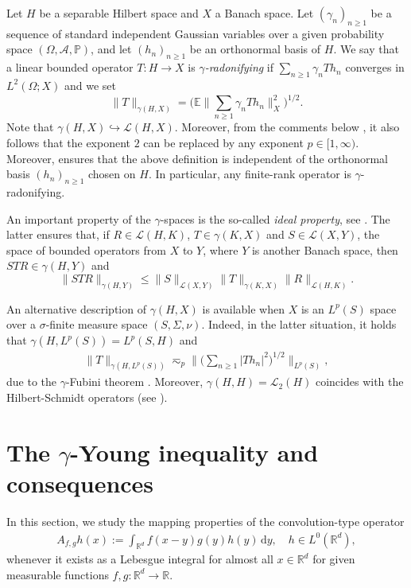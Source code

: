 \documentclass[reqno]{amsart}
\theoremstyle{plain}
\theoremstyle{remark}
\theoremstyle{plain}
\numberwithin{equation}{section}
\newcommand\bR{\mathbb{R}}
\renewcommand\P{\mathbb{P}}
\newcommand\calL{\mathcal{L}}
\def\R{{\mathbb R}}
\newcommand{\E}{{\mathbb E}}
\renewcommand{\P}{{\mathbb P}}
\newcommand{\g}{\gamma}
\renewcommand{\O}{\Omega}
\newcommand{\di}{\mathrm{d}}
\newcommand{\1}{\one}
\newcommand{\embed}{\hookrightarrow}
\begin{document}
\smallskip

Let $H$ be a separable Hilbert space and $X$ a Banach space.
Let $(\g_n)_{n\geq 1}$ be a sequence of standard independent Gaussian variables over a given probability space $(\O,\mathcal{A},\P)$, and let $(h_n)_{n\geq 1}$ be an orthonormal basis of $H$. 
We say that a linear bounded operator $T:H\to X$ is \emph{$\g$-radonifying} if $\sum_{n\geq 1} \g_n T h_n$ converges in $L^2(\O;X)$ and we set
\begin{equation}
\label{eq:def_gamma_norm}
\|T\|_{\g(H,X)}=
\Big(\E \Big\| \sum_{n\geq 1} \g_n T h_n\Big\|_{X}^2\Big)^{1/2}.
\end{equation}
Note that $\g(H,X)\embed \calL(H,X)$. Moreover, from the comments below \cite[Definition 9.1.1]{HNVW2}, it also follows that the exponent $2$ can be replaced by any exponent $p\in [1,\infty)$.
Moreover, \cite[Theorem 9.1.17]{HNVW2} ensures that the above definition is independent of the orthonormal basis $(h_n)_{n\geq 1}$ chosen on $H$. 
In particular, any finite-rank operator is $\gamma$-radonifying. 


An important property of the $\gamma$-spaces is the so-called \emph{ideal property}, see \cite[Theorem 9.1.10]{HNVW2}. The latter ensures that, if $R\in \calL(H,K)$, $T\in \g(K,X)$ and $S\in \calL(X,Y)$, the space of bounded operators from $X$ to $Y$, where $Y$ is another Banach space, then 
$STR\in \g(H,Y)$ and 
\begin{equation}
\label{eq:gamma_ideal}
\|STR\|_{\g(H,Y)}\leq\|S\|_{\calL(X,Y)} \|T\|_{\g(K,X)} \|R\|_{\calL(H,K)}.
\end{equation}

An alternative description of $\g(H,X)$ is available when $X$ is an $L^p(S)$ space over a $\sigma$-finite measure space $(S,\Sigma,\nu)$. Indeed, in the latter situation, it holds that $\g(H,L^p(S))=L^p(S,H)$ and 
\begin{align}
\label{eq: square fct char gamma}
    \|T\|_{\gamma(H,L^p(S))} \eqsim_p \Big\| \Big(  \sum_{n\geq 1} |Th_n|^2 \Big)^{1/2} \Big\|_{L^p(S)},
\end{align}
due to the $\gamma$-Fubini theorem \cite[Theorem 9.4.8]{HNVW2}. Moreover, $\gamma(H,H)=\calL_2(H)$ coincides with the Hilbert-Schmidt operators (see \cite[Proposition 9.1.9]{HNVW2}). 



\section{The $\gamma$-Young inequality and consequences}
\label{s:gamma_consequences}
In this section, we study the mapping properties of the  convolution-type operator
\begin{align}\label{eq:Afg}
A_{f,g} h(x) := \int_{\R^d} f(x-y) g(y) h(y) \, \di y,\quad h\in L^0(\bR^d),
\end{align}
whenever it exists as a Lebesgue integral for almost all $x\in \R^d$ for given measurable functions $f,g:\bR^d\to \bR$.
\end{document}
